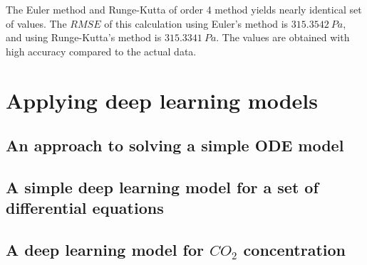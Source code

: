 \documentclass[a4paper]{article}
\numberwithin{equation}{section}
\begin{document}
The Euler method and Runge-Kutta of order 4 method yields nearly identical set of values. The \(RMSE\) of this calculation using Euler's method is \(315.3542\ Pa\), and using Runge-Kutta's method is \(315.3341\ Pa\). The values are obtained with high accuracy compared to the actual data.

\newpage
\section{Applying deep learning models}
\subsection{An approach to solving a simple ODE model}

\subsection{A simple deep learning model for a set of differential equations}

\subsection{A deep learning model for \texorpdfstring{\(CO_2\)}{} concentration}

\newpage

\printbibliography[heading=bibintoc]

\begin{versionhistory}
\end{versionhistory}
\end{document}
